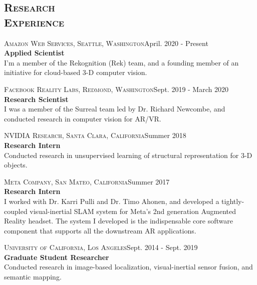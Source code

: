 \documentclass[margin, line, 10pt]{res} %
\begin{document}
\begin{resume}
\section{\textsc{Research\\Experience}}

\textsc{Amazon Web Services, Seattle, Washington}\hfill April. 2020 - Present \\
\textbf{Applied Scientist}\\ 
I'm a member of the Rekognition (Rek) team, and a founding member of an initiative for cloud-based 3-D computer vision.

\textsc{Facebook Reality Labs, Redmond, Washington}\hfill Sept. 2019 - March 2020 \\
\textbf{Research Scientist}\\
I was a member of the Surreal team led by Dr. Richard Newcombe, and conducted research in computer vision for AR/VR.

\textsc{NVIDIA Research, Santa Clara, California}\hfill Summer 2018\\
\textbf{Research Intern}\\
Conducted research in unsupervised learning of structural representation for 3-D objects.

\textsc{Meta Company, San Mateo, California}\hfill Summer 2017\\
\textbf{Research Intern}\\
I worked with Dr. Karri Pulli and Dr. Timo Ahonen, and developed a tightly-coupled visual-inertial SLAM system for Meta's 2nd generation Augmented Reality headset. The system I developed is the indispensable core software component that supports all the downstream AR applications.

\textsc{University of California, Los Angeles}\hfill Sept. 2014 - Sept. 2019\\
\textbf{Graduate Student Researcher}\\
Conducted research in image-based localization, visual-inertial sensor fusion, and semantic mapping.





\end{resume}
\end{document}
